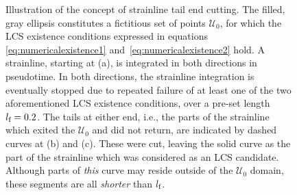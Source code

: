 \begin{figure}[htpb]
    \centering
    \def\svgwidth{0.8\linewidth}
    
    \caption[Illustration of the concept of strainline tail end cutting]%
    {Illustration of the concept of strainline tail end cutting. The
    filled, gray ellipsis constitutes a fictitious set of points $\mathcal{U}_{0}$,
    for which the LCS existence conditions expressed in equations
    \eqref{eq:numericalexistence1} and~\eqref{eq:numericalexistence2} hold. A
    strainline, starting at (a), is integrated in both directions in
    pseudotime. In both directions, the strainline integration is eventually
    stopped due to repeated failure of at least one of the two aforementioned
    LCS existence conditions, over a pre-set length $l_{\textnormal{f}}=0.2$.
    The tails at either end, i.e., the parts of the strainline which exited
    the $\mathcal{U}_{0}$ and did not return, are indicated by dashed curves at
    (b) and (c). These were cut, leaving the solid curve as the part of
    the strainline which was considered as an LCS candidate. Although parts
    of \emph{this} curve may reside outside of the $\mathcal{U}_{0}$ domain, these segments are all
\emph{shorter} than $l_{\textnormal{f}}$.}
    \label{fig:tailcutting}
\end{figure}
